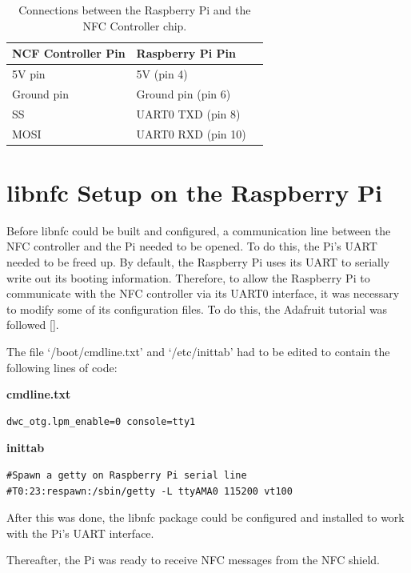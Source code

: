 \begin{table}
\centering
 \caption{Connections between the Raspberry Pi and the NFC Controller chip.}
 \begin{tabular}{|l|l|l|}
  \hline
  \textbf{NCF Controller Pin} & \textbf{Raspberry Pi Pin}\\\hline\hline
  5V pin & 5V (pin 4) \\\hline
  Ground pin & Ground pin (pin 6) \\\hline
  SS & UART0 TXD (pin 8) \\\hline
  MOSI & UART0 RXD (pin 10) \\\hline
 \end{tabular}
 \label{tab:chip-connections}
\end{table}

\section{libnfc Setup on the Raspberry Pi}

Before libnfc could be built and configured, a communication line between the NFC
controller and the Pi needed to be opened. To do this, the Pi's UART needed
to be freed up. By default, the Raspberry Pi uses its UART to serially write out
its booting information. Therefore, to allow the Raspberry Pi to communicate
with the NFC controller via its UART0 interface, it was necessary to modify
some of its configuration files. To do this, the Adafruit tutorial was followed
[\cite{website:adafruit-tutorial}].

The file `/boot/cmdline.txt' and `/etc/inittab' had to be edited to
contain the following lines of code:

\textbf{cmdline.txt}
\begin{verbatim}
dwc_otg.lpm_enable=0 console=tty1
\end{verbatim}

\textbf{inittab}
\begin{verbatim}
#Spawn a getty on Raspberry Pi serial line
#T0:23:respawn:/sbin/getty -L ttyAMA0 115200 vt100
\end{verbatim}

After this was done, the libnfc package could be configured and installed 
to work with the Pi's UART interface.

Thereafter, the Pi was ready to receive NFC messages from the NFC shield.